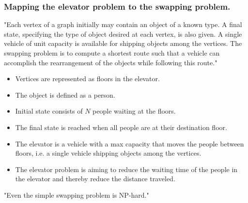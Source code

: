 
\subsubsection{Mapping the elevator problem to the swapping problem.}
"Each vertex of a graph initially may contain an object of a known type. A final state, specifying the type of object desired at each vertex, is also given. A single vehicle of unit capacity is available for shipping objects among the vertices. The swapping problem is to compute a shortest route such that a vehicle can accomplish the rearrangement of the objects while following this route."\cite{anily1992swapping}

\begin{itemize}
	\item Vertices are represented as floors in the elevator.
	\item The object is defined as a person.
	\item Initial state consists of $ N $ people waiting at the floors.
	\item The final state is reached when all people are at their destination floor.
	\item The elevator is a vehicle with a max capacity that moves the people between floors, i.e. a single vehicle shipping objects among the vertices.
	\item The elevator problem is aiming to reduce the waiting time of the people in the elevator and thereby reduce the distance traveled.
\end{itemize}

"Even the simple swapping problem is NP-hard."\cite{anily1992swapping}
